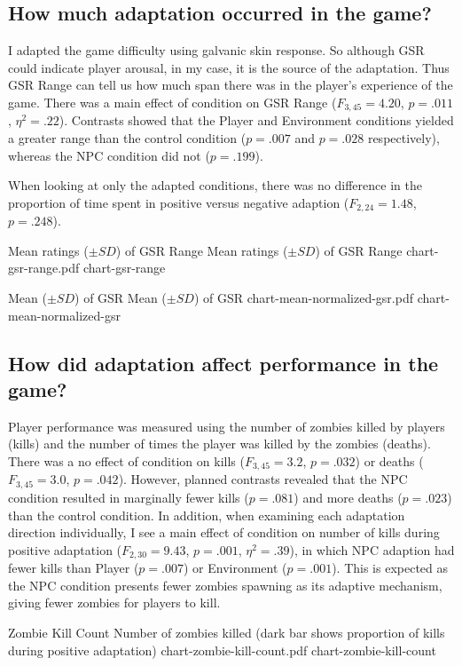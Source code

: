 \subsection{How much adaptation occurred in the game?}

I adapted the game difficulty using galvanic skin response. So although GSR could indicate player arousal, in my case, it is the source of the adaptation. Thus GSR Range can tell us how much span there was in the player's experience of the game. There was a main effect of condition on GSR Range ($F_{3,45} = 4.20$, $p = .011$, $\eta^{2} = .22$). Contrasts showed that the Player and Environment conditions yielded a greater range than the control condition ($p = .007$ and $p = .028$ respectively), whereas the NPC condition did not ($p = .199$).

When looking at only the adapted conditions, there was no difference in the proportion of time spent in positive versus negative adaption ($F_{2,24} = 1.48$, $p = .248$).

\img
{Mean ratings ($\pm SD$) of GSR Range}
{Mean ratings ($\pm SD$) of GSR Range}
{chart-gsr-range.pdf}
{chart-gsr-range}

\img
{Mean ($\pm SD$) of GSR}
{Mean ($\pm SD$) of GSR}
{chart-mean-normalized-gsr.pdf}
{chart-mean-normalized-gsr}


\subsection{How did adaptation affect performance in the game?}

Player performance was measured using the number of zombies killed by players (kills) and the number of times the player was killed by the zombies (deaths). There was a no effect of condition on kills ($F_{3,45} = 3.2$, $p = .032$) or deaths ($F_{3,45} = 3.0$, $p = .042$). However, planned contrasts revealed that the NPC condition resulted in marginally fewer kills ($p = .081$) and more deaths ($p = .023$) than the control condition. In addition, when examining each adaptation direction individually, I see a main effect of condition on number of kills during positive adaptation ($F_{2,30} = 9.43$, $p = .001$, $\eta^{2} = .39$), in which NPC adaption had fewer kills than Player ($p = .007$) or Environment ($p = .001$). This is expected as the NPC condition presents fewer zombies spawning as its adaptive mechanism, giving fewer zombies for players to kill.

\img
{Zombie Kill Count}
{Number of zombies killed (dark bar shows proportion of kills during positive adaptation)}
{chart-zombie-kill-count.pdf}
{chart-zombie-kill-count}

